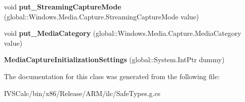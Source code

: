 \begin{DoxyCompactItemize}
void {\bfseries put\+\_\+\+Streaming\+Capture\+Mode} (global\+::\+Windows.\+Media.\+Capture.\+Streaming\+Capture\+Mode value)
\item 
\mbox{\label{class_windows_1_1_media_1_1_capture_1_1_media_capture_initialization_settings_a9ec43e909f9030339cf2eb4f47c0e14f}} 
void {\bfseries put\+\_\+\+Media\+Category} (global\+::\+Windows.\+Media.\+Capture.\+Media\+Category value)
\item 
\mbox{\label{class_windows_1_1_media_1_1_capture_1_1_media_capture_initialization_settings_ac7187e1a40d8f32e90a7585f37dec31c}} 
{\bfseries Media\+Capture\+Initialization\+Settings} (global\+::\+System.\+Int\+Ptr dummy)
\end{DoxyCompactItemize}


The documentation for this class was generated from the following file\+:\begin{DoxyCompactItemize}
\item 
I\+V\+S\+Calc/bin/x86/\+Release/\+A\+R\+M/ilc/Safe\+Types.\+g.\+cs\end{DoxyCompactItemize}
